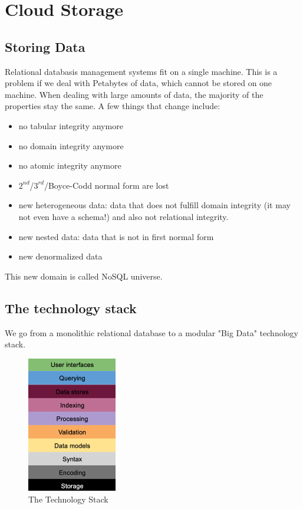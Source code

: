 \section{Cloud Storage}

\subsection{Storing Data}

Relational databasis management systems fit on a single machine. This is a problem if we deal with Petabytes of data, which cannot be stored on one machine.
When dealing with large amounts of data, the majority of the properties stay the same. A few things that change include:
\begin{itemize}
    \item no tabular integrity anymore
    \item no domain integrity anymore
    \item no atomic integrity anymore
    \item $2^{nd}$/$3^{rd}$/Boyce-Codd normal form are lost
    \item new heterogeneous data: data that does not fulfill domain integrity (it may not even have a schema!) and also not relational integrity.
    \item new nested data: data that is not in first normal form
    \item new denormalized data
\end{itemize}
This new domain is called NoSQL universe.

\subsection{The technology stack}
We go from a monolithic relational database to a modular "Big Data" technology stack.

\begin{figure}[h]
    \centering
    \includegraphics[width=0.35\textwidth]{Figures/Technology_Stack.jpeg}
    \caption{The Technology Stack}\label{fig:TechStack}
\end{figure}

